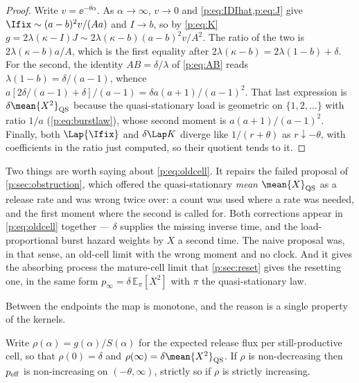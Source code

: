\begin{proof}
Write $v=\ee^{-\theta\alpha}$. As $\alpha\to\infty$, $v\to0$ and
\cref{p:eq:IDIhat,p:eq:J} give $\Ifix\sim(a-b)^2v/(Aa)$ and $I\to b$, so by
\cref{p:eq:K} $g=2\lambda(\kappa-I)J\sim2\lambda(\kappa-b)(a-b)^2v/A^2$. The
ratio of the two is $2\lambda(\kappa-b)a/A$, which is the first equality
after $2\lambda(\kappa-b)=2\lambda(1-b)+\delta$. For the second, the
identity $AB=\delta/\lambda$ of \cref{p:eq:AB} reads
$\lambda(1-b)=\delta/(a-1)$, whence
$a[2\delta/(a-1)+\delta]/(a-1)=\delta a(a+1)/(a-1)^2$. That last expression
is $\delta\mean{X^2}_{\rm QS}$ because the quasi-stationary load is
geometric on $\{1,2,\ldots\}$ with ratio $1/a$ (\cref{p:eq:burstlaw}), whose
second moment is $a(a+1)/(a-1)^2$. Finally, both $\Lap{\Ifix}$ and
$\delta\Lap K$ diverge like $1/(r+\theta)$ as $r\downarrow-\theta$, with
coefficients in the ratio just computed, so their quotient tends to it.
\end{proof}

Two things are worth saying about \cref{p:eq:oldcell}. It repairs the failed
proposal of \cref{p:sec:obstruction}, which offered the quasi-stationary
\emph{mean} $\mean{X}_{\rm QS}$ as a release rate and was wrong twice over:
a count was used where a rate was needed, and the first moment where the
second is called for. Both corrections appear in \cref{p:eq:oldcell}
together --- $\delta$ supplies the missing inverse time, and the
load-proportional burst hazard weights by $X$ a second time. The naive
proposal was, in that sense, an old-cell limit with the wrong moment and no
clock. And it gives the absorbing process the mature-cell limit that
\cref{p:sec:reset} gives the resetting one, in the same form
$p_\infty=\delta\,\mathbb E_\pi[X^2]$ with $\pi$ the quasi-stationary law.

Between the endpoints the map is monotone, and the reason is a single
property of the kernels.

\begin{proposition}
\label{p:prop:peff-monotone}
Write $\rho(\alpha)=g(\alpha)/S(\alpha)$ for the expected release flux per
still-productive cell, so that $\rho(0)=\delta$ and
$\rho(\infty)=\delta\mean{X^2}_{\rm QS}$. If $\rho$ is non-decreasing then
$p_{\rm eff}$ is non-increasing on $(-\theta,\infty)$, strictly so if $\rho$
is strictly increasing.
\end{proposition}

